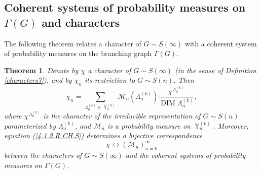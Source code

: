 \documentclass[12pt]{amsart}
\newtheorem{thm}{Theorem}[section]
\theoremstyle{definition}
\numberwithin{equation}{section}
\DeclareMathOperator{\Y}{\mathbb{Y}}
\DeclareMathOperator{\DIM}{DIM}
\begin{document}
\subsection{Coherent systems of probability measures on $\Gamma\left(G\right)$ and characters}
The following theorem relates a character of $G\sim S(\infty)$ with a coherent system of probability measures on the branching graph $\Gamma \left(G\right)$.
\begin{thm}\label{THEOREM4.1.2.CharCSystems}
Denote by $\chi$ a character of $G\sim S(\infty)$  (in the sense of Definition
\ref{characters7}), and by $\chi_n$ its restriction to $G\sim S(n)$.
Then
\begin{equation}\label{4.1.2.R.CH.S}
\chi_n=\sum\limits_{\Lambda_n^{(k)}\in\Y_n^{(k)}}
\mathcal{M}_n\left(\Lambda_n^{(k)}\right)
\frac{\chi^{\Lambda_n^{(k)}}}{\DIM\Lambda_n^{(k)}},
\end{equation}
where $\chi^{\Lambda_n^{(k)}}$ is the character of the irreducible representation of $G\sim S(n)$ parameterized by $\Lambda_n^{(k)}$, and $\mathcal{M}_n$ is a probability measure on $\Y_n^{(k)}$. Moreover, equation (\ref{4.1.2.R.CH.S}) determines a bijective correspondence
$$
\chi\longleftrightarrow\left(\mathcal{M}_n\right)_{n=0}^{\infty}
$$
between the characters of $G\sim S(\infty)$ and the coherent systems of probability measures on $\Gamma\left(G\right)$.
\end{thm}
\end{document}
